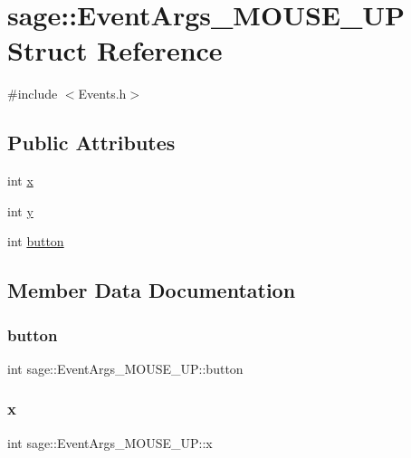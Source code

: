 \hypertarget{structsage_1_1EventArgs__MOUSE__UP}{}\section{sage\+::Event\+Args\+\_\+\+M\+O\+U\+S\+E\+\_\+\+UP Struct Reference}
\label{structsage_1_1EventArgs__MOUSE__UP}


{\ttfamily \#include $<$Events.\+h$>$}

\subsection*{Public Attributes}
\begin{DoxyCompactItemize}
\item 
int \mbox{\hyperlink{structsage_1_1EventArgs__MOUSE__UP_a87409589830eeedb2436aa6af71a7829}{x}}
\item 
int \mbox{\hyperlink{structsage_1_1EventArgs__MOUSE__UP_a31ac9bc6c023388b35bbbff816922883}{y}}
\item 
int \mbox{\hyperlink{structsage_1_1EventArgs__MOUSE__UP_a64964cc408ca807e1223ab1abf2bb5aa}{button}}
\end{DoxyCompactItemize}


\subsection{Member Data Documentation}
\mbox{\label{structsage_1_1EventArgs__MOUSE__UP_a64964cc408ca807e1223ab1abf2bb5aa}} 
\subsubsection{\texorpdfstring{button}{button}}
{\footnotesize\ttfamily int sage\+::\+Event\+Args\+\_\+\+M\+O\+U\+S\+E\+\_\+\+U\+P\+::button}

\mbox{\label{structsage_1_1EventArgs__MOUSE__UP_a87409589830eeedb2436aa6af71a7829}} 
\subsubsection{\texorpdfstring{x}{x}}
{\footnotesize\ttfamily int sage\+::\+Event\+Args\+\_\+\+M\+O\+U\+S\+E\+\_\+\+U\+P\+::x}

